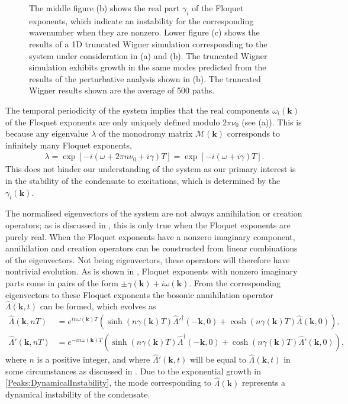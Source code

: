 \begin{figure}
{        The middle figure (b) shows the real part $\gamma_i$ of the Floquet exponents, which indicate an instability for the corresponding wavenumber when they are nonzero.
        Lower figure (c) shows the results of a 1D truncated Wigner simulation corresponding to the system under consideration in (a) and (b). The truncated Wigner simulation exhibits growth in the same modes predicted from the results of the perturbative analysis shown in (b). The truncated Wigner results shown are the average of 500 paths.
        \label{Peaks:CondensateEigenvalues}}
\end{figure}

The temporal periodicity of the system implies that the real components $\omega_i(\bm{k})$ of the Floquet exponents are only uniquely defined modulo $2\pi \nu_0$ (see (a)). This is because any eigenvalue $\lambda$ of the monodromy matrix $\mathcal{M}(\bm{k})$ corresponds to infinitely many Floquet exponents,
\begin{align}
    \label{Peaks:AmbiguityFloquetExponent}
    \lambda = \exp\left[-i \left(\omega + 2 \pi n \nu_0 + i \gamma\right)T\right] = \exp\left[-i\left(\omega + i \gamma\right)T\right].
\end{align}
This does not hinder our understanding of the system as our primary interest is in the stability of the condensate to excitations, which is determined by the $\gamma_i(\bm{k})$.

The normalised eigenvectors of the system are not always annihilation or creation operators; as is discussed in , this is only true when the Floquet exponents are purely real. When the Floquet exponents have a nonzero imaginary component, annihilation and creation operators can be constructed from linear combinations of the eigenvectors. Not being eigenvectors, these operators will therefore have nontrivial evolution. As is shown in , Floquet exponents with nonzero imaginary parts come in pairs of the form $\pm \gamma(\bm{k}) + i \omega(\bm{k})$. From the corresponding eigenvectors to these Floquet exponents the bosonic annihilation operator $\hat{\Lambda}(\bm{k}, t)$ can be formed, which evolves as
\begin{subequations}
    \label{Peaks:DynamicalInstability}
    \begin{align}
        \hat{\Lambda}(\bm{k}, nT) &= e^{i n\omega(\bm{k}) T} \left( \sinh(n\gamma(\bm{k}) T) \hat{\Lambda}'^\dagger(-\bm{k}, 0) + \cosh(n\gamma(\bm{k}) T) \hat{\Lambda}(\bm{k}, 0)\right),\\
        \hat{\Lambda}'(\bm{k}, nT) &= e^{-i n \omega(\bm{k}) T} \left( \sinh(n\gamma(\bm{k}) T) \hat{\Lambda}^\dagger(-\bm{k}, 0) + \cosh(n\gamma(\bm{k}) T) \hat{\Lambda}'(\bm{k}, 0)\right),
    \end{align}
\end{subequations}
where $n$ is a positive integer, and where $\hat{\Lambda}'(\bm{k}, t)$ will be equal to $\hat{\Lambda}(\bm{k}, t)$ in some circumstances as discussed in . Due to the exponential growth in \eqref{Peaks:DynamicalInstability}, the mode corresponding to $\hat{\Lambda}(\bm{k})$ represents a dynamical instability of the condensate.

